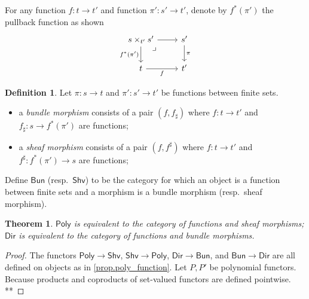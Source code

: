 \documentclass[11pt, article, one side]{memoir}
\theoremstyle{theorem}
\newtheorem{theorem}[equation]{Theorem}
\theoremstyle{definition}
\newtheorem{definition}[equation]{Definition}
\theoremstyle{remark}
\newcommand{\Cat}[1]{\mathsf{#1}}%
\newcommand{\bun}{\Cat{Bun}}
\newcommand{\shv}{\Cat{Shv}}
\newcommand{\poly}{\Cat{Poly}}
\newcommand{\dir}{\Cat{Dir}}
\begin{document}
For any function $f\colon t\to t'$ and function $\pi'\colon s'\to t'$, denote by $f^*(\pi')$ the pullback function as shown
\[
\begin{tikzcd}
	s\times_{t'}s'\ar[r]\ar[d, "f^*(\pi')"']&
	s'\ar[d, "\pi"]\\
	t\ar[r, "f"']&
	t'\ar[ul, phantom, very near end, "\lrcorner"]
\end{tikzcd}
\]

\begin{definition}\label{def.sheaves_bundles}
Let $\pi\colon s\to t$ and $\pi'\colon s'\to t'$ be functions between finite sets.
\begin{itemize}
	\item a \emph{bundle morphism} consists of a pair $(f,f_\sharp)$ where $f\colon t\to t'$ and $f_\sharp\colon s\to f^*(\pi')$ are functions;
	\item a \emph{sheaf morphism} consists of a pair $(f,f^\sharp)$ where $f\colon t\to t'$ and $f^\sharp\colon f^*(\pi')\to s$ are functions;
\end{itemize}
Define $\bun$ (resp.\ $\shv$) to be the category for which an object is a function between finite sets and a morphism is a bundle morphism (resp.\ sheaf morphism).
\end{definition}

\begin{theorem}
$\poly$ is equivalent to the category of functions and sheaf morphisms; $\dir$ is equivalent to the category of functions and bundle morphisms.
\end{theorem}
\begin{proof}
The functors $\poly\to\shv$, $\shv\to\poly$, $\dir\to\bun$, and $\bun\to\dir$ are all defined on objects as in \cref{prop.poly_function}. Let $P,P'$ be polynomial functors. Because products and coproducts of set-valued functors are defined pointwise.
**
\end{proof}
\end{document}
